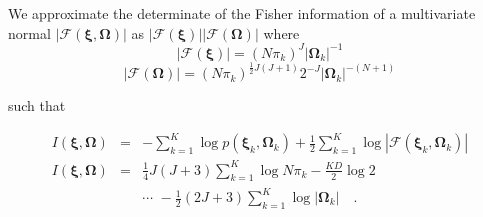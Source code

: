 \documentclass[twocolumn]{aastex62}
\newcommand{\vect}[1]{\boldsymbol{\mathbf{#1}}}
\renewcommand{\vec}[1]{\vect{#1}}
\newcommand{\weight}{\pi}
\newcommand{\scoremeans}{\vec\xi}
\newcommand{\scorecovs}{\vec\Omega}
\newcommand{\NumData}{N}
\newcommand{\NumLatentFactors}{J}
\newcommand{\NumComponents}{K}
\newcommand{\numcomponents}{k}
\begin{document}
We approximate the determinate of the Fisher information of a multivariate normal $|\mathcal{F}(\scoremeans,\scorecovs)|$
as $|\mathcal{F}(\scoremeans)||\mathcal{F}(\scorecovs)|$ \citep{Oliver:1996,Figueiredo:2002} where
\begin{equation}
	|\mathcal{F}(\scoremeans)| = (\NumData\weight_k)^\NumLatentFactors|\scorecovs_k|^{-1}
\end{equation}
\begin{equation}
	|\mathcal{F}(\scorecovs)| = (\NumData\weight_k)^{\frac{1}{2}\NumLatentFactors(\NumLatentFactors+1)}2^{-\NumLatentFactors}|\scorecovs_k|^{-(\NumData+1)}
\end{equation}

\noindent{}such that 

\begin{eqnarray}
	I(\scoremeans,\scorecovs) &=& -\sum_{\numcomponents=1}^{\NumComponents}\log{p(\scoremeans_k,\scorecovs_k)} + \frac{1}{2}\sum_{\numcomponents=1}^{\NumComponents}\log{|\mathcal{F}(\scoremeans_k,\scorecovs_k)|} \nonumber \\
I(\scoremeans,\scorecovs) &=& \frac{1}{4}\NumLatentFactors(\NumLatentFactors+3)\sum_{\numcomponents=1}^\NumComponents\log{\NumData\weight_k} - \frac{KD}{2}\log{2} \nonumber \\ 
&& \cdots \,\, -\frac{1}{2}(2\NumLatentFactors+3)\sum_{k=1}^{K}\log{|\scorecovs_k|}  \quad . \label{eq:prior_xi_omega} 
\end{eqnarray}
\end{document}
